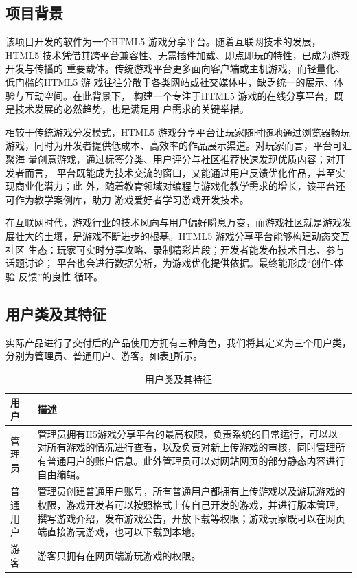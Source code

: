 \documentclass[12pt]{ctexart} %
\begin{document}
\subsection{项目背景}
该项目开发的软件为一个HTML5 游戏分享平台。随着互联网技术的发展，HTML5
技术凭借其跨平台兼容性、无需插件加载、即点即玩的特性，已成为游戏开发与传播的
重要载体。传统游戏平台更多面向客户端或主机游戏，而轻量化、低门槛的HTML5 游
戏往往分散于各类网站或社交媒体中，缺乏统一的展示、体验与互动空间。在此背景下，
构建一个专注于HTML5 游戏的在线分享平台，既是技术发展的必然趋势，也是满足用
户需求的关键举措。

相较于传统游戏分发模式，HTML5 游戏分享平台让玩家随时随地通过浏览器畅玩
游戏，同时为开发者提供低成本、高效率的作品展示渠道。对玩家而言，平台可汇聚海
量创意游戏，通过标签分类、用户评分与社区推荐快速发现优质内容；对开发者而言，
平台既能成为技术交流的窗口，又能通过用户反馈优化作品，甚至实现商业化潜力；此
外，随着教育领域对编程与游戏化教学需求的增长，该平台还可作为教学案例库，助力
游戏爱好者学习游戏开发技术。

在互联网时代，游戏行业的技术风向与用户偏好瞬息万变，而游戏社区就是游戏发
展壮大的土壤，是游戏不断进步的根基。HTML5 游戏分享平台能够构建动态交互社区
生态：玩家可实时分享攻略、录制精彩片段；开发者能发布技术日志、参与话题讨论；
平台也会进行数据分析，为游戏优化提供依据。最终能形成“创作-体验-反馈”的良性
循环。

\subsection{用户类及其特征}
实际产品进行了交付后的产品使用方拥有三种角色，我们将其定义为三个用户类，
分别为管理员、普通用户、游客。如表\ref{tab:usertable}所示。

\begin{table}[htbp]
    \centering
    
    \begin{tabular}{|p{2cm}|p{10cm}|}
        \hline
        用户 & 描述\\
        \hline
        管理员 & 管理员拥有H5游戏分享平台的最高权限，负责系统的日常运行，可以以对所有游戏的情况进行查看，以及负责对新上传游戏的审核，同时管理所有普通用户的账户信息。此外管理员可以对网站网页的部分静态内容进行自由编辑。 \\
        \hline
        普通用户 & 管理员创建普通用户账号，所有普通用户都拥有上传游戏以及游玩游戏的权限，游戏开发者可以按照格式上传自己开发的游戏，并进行版本管理，撰写游戏介绍，发布游戏公告，开放下载等权限；游戏玩家既可以在网页端直接游玩游戏，也可以下载到本地。 \\
        \hline
        游客 & 游客只拥有在网页端游玩游戏的权限。\\
        \hline
    \end{tabular}
    \caption{用户类及其特征}
    \label{tab:usertable}
\end{table}
\end{document}

